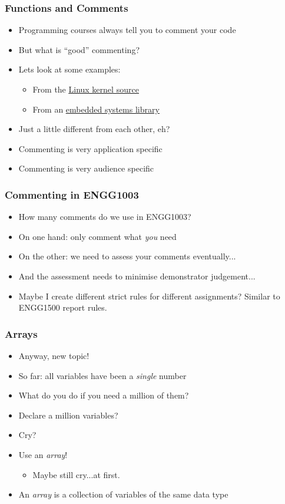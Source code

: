 \documentclass[14pt]{beamer}
\begin{document}
\begin{frame}
\frametitle{Functions and Comments}
\begin{itemize}
\item Programming courses always tell you to comment your code
\item But what is ``good'' commenting?
\item Lets look at some examples:
\pause
	\begin{itemize}
		\item From the \underline{\href{https://raw.githubusercontent.com/torvalds/linux/master/kernel/async.c}{Linux kernel source}}
		\pause
		\item From an \underline{\href{http://libopencm3.org/docs/latest/stm32f4/html/adc_8c_source.html}{embedded systems library}}
	\end{itemize}
\pause
\item Just a little different from each other, eh?
\item Commenting is very application specific
\item Commenting is very audience specific
\end{itemize}
\end{frame}

\begin{frame}
\frametitle{Commenting in ENGG1003}
\begin{itemize}
\item How many comments do we use in ENGG1003?
\item On one hand: only comment what \textit{you} need
\item On the other: we need to assess your comments eventually...
\pause
\item And the assessment needs to minimise demonstrator judgement...
\pause
\item Maybe I create different strict rules for different assignments? Similar to ENGG1500 report rules.
\end{itemize}
\end{frame}

\begin{frame}
\frametitle{Arrays}
\begin{itemize}
\item Anyway, new topic!
\item So far: all variables have been a \textit{single} number
\item What do you do if you need a million of them?
\pause
\item Declare a million variables?
\pause
\item Cry?
\pause
\item Use an \textit{array}!
\pause
	\begin{itemize}
		\item Maybe still cry...at first.
	\end{itemize}
\pause
\item An \textit{array} is a collection of variables of the same data type
\end{itemize}
\end{frame}
\end{document}
